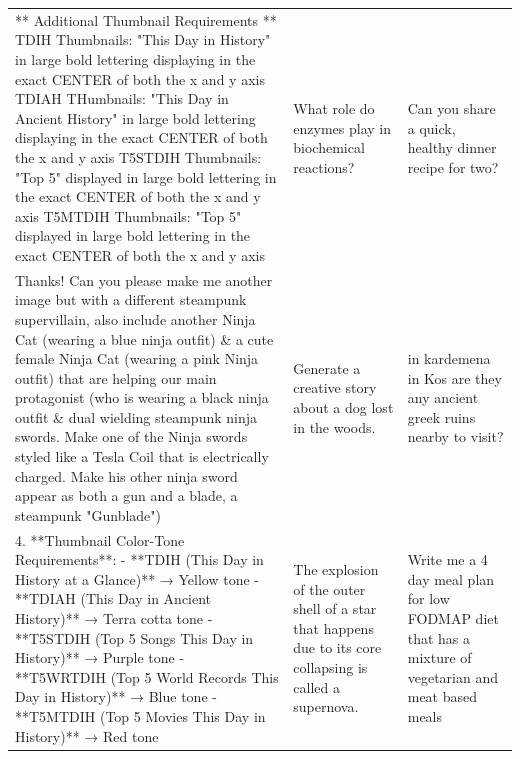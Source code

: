 \begin{table}[ht]
\begin{tabular}{p{4.3cm}p{4.3cm}p{4.3cm}}
** Additional Thumbnail Requirements ** TDIH Thumbnails: "This Day in History" in large bold lettering displaying in the exact CENTER of both the x and y axis TDIAH THumbnails: "This Day in Ancient History" in large bold lettering displaying in the exact CENTER of both the x and y axis T5STDIH Thumbnails: "Top 5" displayed in large bold lettering in the exact CENTER of both the x and y axis T5MTDIH Thumbnails: "Top 5" displayed in large bold lettering in the exact CENTER of both the x and y axis & What role do enzymes play in biochemical reactions? & Can you share a quick, healthy dinner recipe for two? \\[4pt]
Thanks! Can you please make me another image but with a different steampunk supervillain, also include another Ninja Cat (wearing a blue ninja outfit) \& a cute female Ninja Cat (wearing a pink Ninja outfit) that are helping our main protagonist (who is wearing a black ninja outfit \& dual wielding steampunk ninja swords. Make one of the Ninja swords styled like a Tesla Coil that is electrically charged. Make his other ninja sword appear as both a gun and a blade, a steampunk "Gunblade") & Generate a creative story about a dog lost in the woods. & in kardemena in Kos are they any ancient greek ruins nearby to visit? \\[4pt]
4. **Thumbnail Color-Tone Requirements**:    - **TDIH (This Day in History at a Glance)** → Yellow tone    - **TDIAH (This Day in Ancient History)** → Terra cotta tone    - **T5STDIH (Top 5 Songs This Day in History)** → Purple tone    - **T5WRTDIH (Top 5 World Records This Day in History)** → Blue tone    - **T5MTDIH (Top 5 Movies This Day in History)** → Red tone & The explosion of the outer shell of a star that happens due to its core collapsing is called a supernova. & Write me a 4 day meal plan for low FODMAP diet that has a mixture of vegetarian and meat based meals \\[4pt]

\end{tabular}
\end{table}
